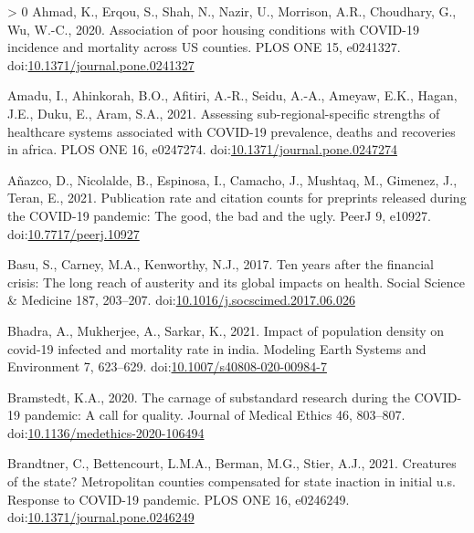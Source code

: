 \documentclass[]{elsarticle} %
\newlength{\cslhangindent}
\newenvironment{CSLReferences}[3] %
 {%
  \setlength{\parindent}{0pt}
  \ifodd #1 \everypar{\setlength{\hangindent}{\cslhangindent}}\ignorespaces\fi
  \ifnum #2 > 0
  \setlength{\parskip}{#2\baselineskip}
  \fi
 }%
 {}
\begin{document}
\hypertarget{refs}{}
\begin{CSLReferences}{1}{0}
\leavevmode\hypertarget{ref-Ahmad2020association}{}%
Ahmad, K., Erqou, S., Shah, N., Nazir, U., Morrison, A.R., Choudhary,
G., Wu, W.-C., 2020. Association of poor housing conditions with
COVID-19 incidence and mortality across US counties. PLOS ONE 15,
e0241327.
doi:\href{https://doi.org/10.1371/journal.pone.0241327}{10.1371/journal.pone.0241327}

\leavevmode\hypertarget{ref-Amadu2021assessing}{}%
Amadu, I., Ahinkorah, B.O., Afitiri, A.-R., Seidu, A.-A., Ameyaw, E.K.,
Hagan, J.E., Duku, E., Aram, S.A., 2021. Assessing sub-regional-specific
strengths of healthcare systems associated with COVID-19 prevalence,
deaths and recoveries in africa. PLOS ONE 16, e0247274.
doi:\href{https://doi.org/10.1371/journal.pone.0247274}{10.1371/journal.pone.0247274}

\leavevmode\hypertarget{ref-Anazco2021publication}{}%
Añazco, D., Nicolalde, B., Espinosa, I., Camacho, J., Mushtaq, M.,
Gimenez, J., Teran, E., 2021. Publication rate and citation counts for
preprints released during the COVID-19 pandemic: The good, the bad and
the ugly. PeerJ 9, e10927.
doi:\href{https://doi.org/10.7717/peerj.10927}{10.7717/peerj.10927}

\leavevmode\hypertarget{ref-Basu2017ten}{}%
Basu, S., Carney, M.A., Kenworthy, N.J., 2017. Ten years after the
financial crisis: The long reach of austerity and its global impacts on
health. Social Science \& Medicine 187, 203--207.
doi:\href{https://doi.org/10.1016/j.socscimed.2017.06.026}{10.1016/j.socscimed.2017.06.026}

\leavevmode\hypertarget{ref-Bhadra2021impact}{}%
Bhadra, A., Mukherjee, A., Sarkar, K., 2021. Impact of population
density on covid-19 infected and mortality rate in india. Modeling Earth
Systems and Environment 7, 623--629.
doi:\href{https://doi.org/10.1007/s40808-020-00984-7}{10.1007/s40808-020-00984-7}

\leavevmode\hypertarget{ref-Bramstedt2020carnage}{}%
Bramstedt, K.A., 2020. The carnage of substandard research during the
COVID-19 pandemic: A call for quality. Journal of Medical Ethics 46,
803--807.
doi:\href{https://doi.org/10.1136/medethics-2020-106494}{10.1136/medethics-2020-106494}

\leavevmode\hypertarget{ref-Brandtner2021creatures}{}%
Brandtner, C., Bettencourt, L.M.A., Berman, M.G., Stier, A.J., 2021.
Creatures of the state? Metropolitan counties compensated for state
inaction in initial u.s. Response to COVID-19 pandemic. PLOS ONE 16,
e0246249.
doi:\href{https://doi.org/10.1371/journal.pone.0246249}{10.1371/journal.pone.0246249}


\end{CSLReferences}
\end{document}
